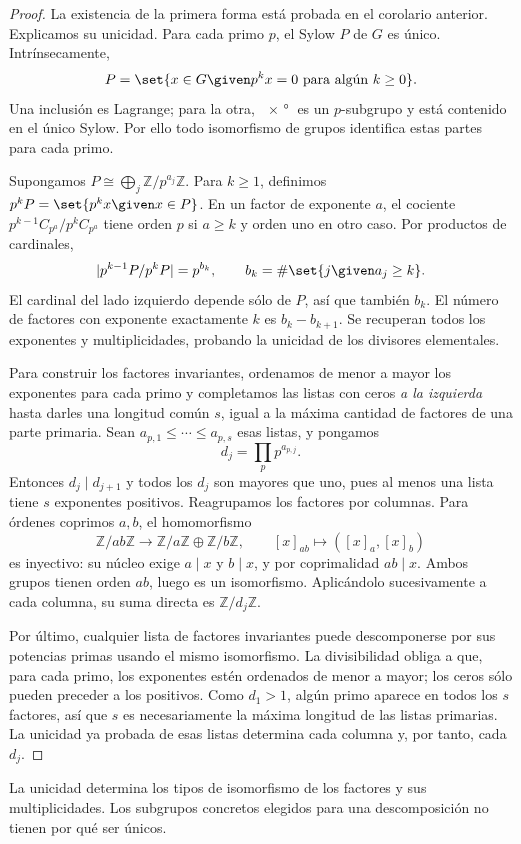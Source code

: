 \begin{proof}
La existencia de la primera forma está probada en el corolario anterior. Explicamos su unicidad. Para cada primo $p$, el Sylow $P$ de $G$ es único. Intrínsecamente,
\[
P=\set{x\in G\given p^k x=0\text{ para algún }k\ge0}.
\]
Una inclusión es Lagrange; para la otra, $\ang{x}$ es un $p$-subgrupo y está contenido en el único Sylow. Por ello todo isomorfismo de grupos identifica estas partes para cada primo.

Supongamos $P\cong\bigoplus_j\mathbb Z/p^{a_j}\mathbb Z$. Para $k\ge1$, definimos $p^kP=\set{p^kx\given x\in P}$. En un factor de exponente $a$, el cociente $p^{k-1}C_{p^a}/p^kC_{p^a}$ tiene orden $p$ si $a\ge k$ y orden uno en otro caso. Por productos de cardinales,
\[
|p^{k-1}P/p^kP|=p^{b_k},\qquad
b_k=\#\set{j\given a_j\ge k}.
\]
El cardinal del lado izquierdo depende sólo de $P$, así que también $b_k$. El número de factores con exponente exactamente $k$ es $b_k-b_{k+1}$. Se recuperan todos los exponentes y multiplicidades, probando la unicidad de los divisores elementales.

Para construir los factores invariantes, ordenamos de menor a mayor los exponentes para cada primo y completamos las listas con ceros \emph{a la izquierda} hasta darles una longitud común $s$, igual a la máxima cantidad de factores de una parte primaria. Sean $a_{p,1}\le\cdots\le a_{p,s}$ esas listas, y pongamos
\[
d_j=\prod_p p^{a_{p,j}}.
\]
Entonces $d_j\mid d_{j+1}$ y todos los $d_j$ son mayores que uno, pues al menos una lista tiene $s$ exponentes positivos. Reagrupamos los factores por columnas. Para órdenes coprimos $a,b$, el homomorfismo
\[
\mathbb Z/ab\mathbb Z\longrightarrow
\mathbb Z/a\mathbb Z\oplus\mathbb Z/b\mathbb Z,
\qquad [x]_{ab}\longmapsto([x]_a,[x]_b)
\]
es inyectivo: su núcleo exige $a\mid x$ y $b\mid x$, y por coprimalidad $ab\mid x$. Ambos grupos tienen orden $ab$, luego es un isomorfismo. Aplicándolo sucesivamente a cada columna, su suma directa es $\mathbb Z/d_j\mathbb Z$.

Por último, cualquier lista de factores invariantes puede descomponerse por sus potencias primas usando el mismo isomorfismo. La divisibilidad obliga a que, para cada primo, los exponentes estén ordenados de menor a mayor; los ceros sólo pueden preceder a los positivos. Como $d_1>1$, algún primo aparece en todos los $s$ factores, así que $s$ es necesariamente la máxima longitud de las listas primarias. La unicidad ya probada de esas listas determina cada columna y, por tanto, cada $d_j$.
\end{proof}
\begin{obs}
La unicidad determina los tipos de isomorfismo de los factores y sus multiplicidades. Los subgrupos concretos elegidos para una descomposición no tienen por qué ser únicos.
\end{obs}

